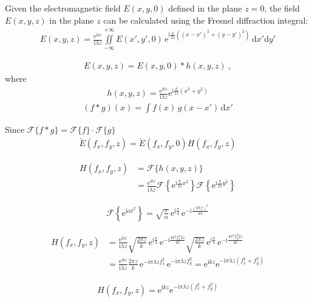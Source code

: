 \documentclass[a4paper,11pt,onecolumn]{scrartcl}
\renewcommand{\i}{\mathrm i}
\newcommand{\e}{\mathrm e}
\begin{document}
Given the electromagnetic field $E(x, y, 0)$ defined in the plane $z = 0$, the field $E(x,y,z)$ in the plane $z$ can be calculated using the Fresnel diffraction integral:
\begin{align}
E(x,y,z) = \frac{\mathrm e^{\i kz}}{\i\lambda z}\iint\limits_{-\infty}^{+\infty} E(x', y', 0)\,\e^{\i\frac{k}{2z}\left((x-x')^2 + (y-y')^2\right)\;}\mathrm dx'\mathrm dy'
\end{align}

\begin{align}
E(x,y,z) = E(x, y, 0) 
* h(x,y,z)\ ,
\end{align}
where
\begin{align}
h(x, y, z) = \frac{\mathrm e^{\i kz}}{\i\lambda z}\e^{\i\frac{k}{2z}(x^2 + y^2)}
\end{align}
\begin{align}
(f * g)(x) = \int f(x)\,g(x - x')\,\mathrm dx' 
\end{align}

Since ${\mathcal {F}}\{f*g\}={\mathcal {F}}\{f\}\cdot {\mathcal {F}}\{g\}$
\begin{align}
\check{E}(f_x, f_y, z) = \check{E}(f_x, f_y, 0)H(f_x, f_y, z)
\end{align}

\begin{align}
H(f_x, f_y, z) &= \mathcal F\{h(x, y,z)\} \\
&= \frac{\mathrm e^{\i kz}}{\i\lambda z} \mathcal F\left\{\e^{\i\frac{k}{2z}x^2 }\right\}\mathcal F\left\{\e^{\i\frac{k}{2z}y^2 }\right\}
\end{align}

\begin{align}
\mathcal F\left\{\e^{\i\alpha t^2 }\right\} = \sqrt{\frac{\pi}{\alpha}} \,\e^{\i\frac{\pi}{4}}\,\e^{-\i\frac{(2\pi f)^2}{4\alpha}}
\end{align}

\begin{align}
H(f_x, f_y, z) &= \frac{\mathrm e^{\i kz}}{\i\lambda z}\sqrt{\frac{2\pi z}{k}} \,\e^{\i\frac{\pi}{4}}\,\e^{-\i\frac{4\pi^2 f_x^2 2z}{4k}} \sqrt{\frac{2\pi z}{k}} \,\e^{\i\frac{\pi}{4}}\,\e^{-\i\frac{4\pi^2 f_y^2 2z}{4k}} \\
&=  \frac{\mathrm e^{\i kz}}{\i\lambda z}\frac{2\pi z}{k}\,\e^{-\i\pi\lambda z f_x^2}\,\e^{-\i\pi\lambda z f_y^2} = \e^{\i kz}\e^{-\i\pi\lambda z(f_x^2 + f_y^2)}
\end{align}

\begin{align}
H(f_x, f_y, z) = \e^{\i kz}\e^{-\i\pi\lambda z(f_x^2+f_y^2)}
\end{align}
\end{document}
